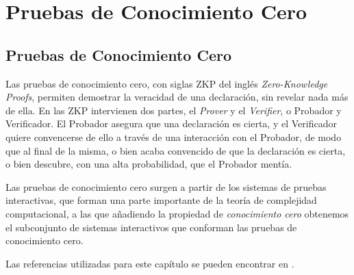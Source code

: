 \part{Pruebas de Conocimiento Cero}

\chapter{Pruebas de Conocimiento Cero}\label{ch:zkp} 


%	


%

Las pruebas de conocimiento cero, con siglas ZKP del inglés \textit{Zero-Knowledge Proofs}, permiten demostrar la veracidad de una declaración, sin revelar nada más de ella. En las ZKP intervienen dos partes, el \textit{Prover} y el \textit{Verifier}, o Probador y Verificador. El Probador asegura que una declaración es cierta, y el Verificador quiere convencerse de ello a través de una interacción con el Probador, de modo que al final de la misma, o bien acaba convencido de que la declaración es cierta, o bien descubre, con una alta probabilidad, que el Probador mentía.

Las pruebas de conocimiento cero surgen a partir de los sistemas de pruebas interactivas, que forman una parte importante de la teoría de complejidad computacional, a las que añadiendo la propiedad de \textit{conocimiento cero} obtenemos el subconjunto de sistemas interactivos que conforman las pruebas de conocimiento cero.

Las referencias utilizadas para este capítulo se pueden encontrar en \citep{pieprzyk2013fundamentals, rosen2007discrete, blum, damgardcommitment, pardo2012introduction, menezes1996handbook, stinson2005cryptography}.


